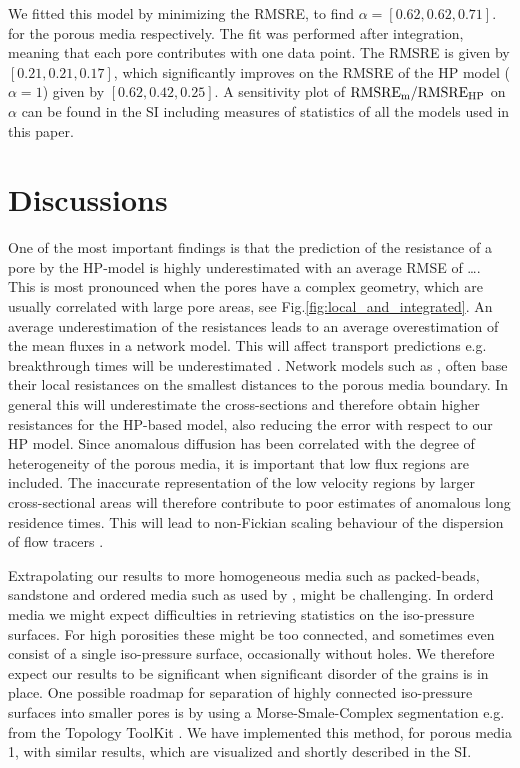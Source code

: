 \documentclass[draft]{agujournal2019}
\begin{document}
We fitted this model by minimizing the RMSRE, to find $\alpha =[0.62, 0.62, 0.71]$. for the porous media respectively. The fit was performed after integration, meaning that each pore contributes with one data point. The RMSRE is given by $[0.21,0.21,0.17]$, which significantly improves on the RMSRE of the HP model ($\alpha = 1$) given by $[0.62,0.42,0.25]$. A sensitivity plot of $\rm{RMSRE}_m/\rm{RMSRE}_{HP}$ on $\alpha$ can be found in the SI including measures of statistics of all the models used in this paper.



\section{Discussions}

One of the most important findings is that the prediction of the resistance of a pore by the HP-model is highly underestimated with an average RMSE of \ldots. This is most pronounced when the pores have a complex geometry, which are usually correlated with large pore areas, see Fig.\ref{fig:local_and_integrated}. An average underestimation of the resistances leads to an average overestimation of the mean fluxes in a network model. This will affect transport predictions e.g. breakthrough times will be underestimated \cite{dentz_mechanisms_2018}. Network models such as \cite{alim_local_2017}, often base their local resistances on the smallest distances to the porous media boundary. In general this will underestimate the cross-sections and therefore obtain higher resistances for the HP-based model, also reducing the error with respect to our HP model. Since anomalous diffusion has been correlated with the degree of heterogeneity of the porous media, it is important that low flux regions are included. The inaccurate representation of the low velocity regions by larger cross-sectional areas will therefore contribute to poor estimates of anomalous long residence times. This will lead to non-Fickian scaling behaviour of the dispersion of flow tracers \cite{dentz_mechanisms_2018,dentz_delay_2006}.

Extrapolating our results to more homogeneous media such as packed-beads, sandstone and ordered media such as used by \cite{alim_local_2017}, might be challenging. In orderd media we might expect difficulties in retrieving statistics on the iso-pressure surfaces. For high porosities these might be too connected, and sometimes even consist of a single iso-pressure surface, occasionally without holes. We therefore expect our results to be significant when significant disorder of the grains is in place. One possible roadmap for separation of highly connected iso-pressure surfaces into smaller pores is by using a Morse-Smale-Complex segmentation e.g. from the Topology ToolKit \cite{tierny_topology_2018}. We have implemented this method, for porous media 1, with similar results, which are visualized and shortly described in the SI. 
\end{document}
